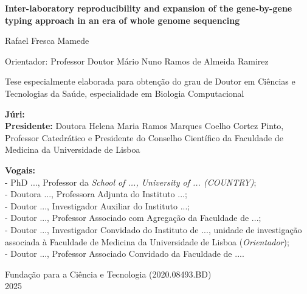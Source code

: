 \begin{titlepage}
\begin{center}
        \vspace{0cm}

        \large
        \textbf{Inter-laboratory reproducibility and expansion of the gene-by-gene typing approach in an era of whole genome sequencing}
        \normalsize
        
        \vspace{0.1cm}
        
        \large
        Rafael Fresca Mamede
        \normalsize
        
        \vspace{0.1cm}
        
        Orientador: Professor Doutor Mário Nuno Ramos de Almeida Ramirez\\
        
        \vspace{0.1cm}
        
        Tese especialmente elaborada para obtenção do grau de Doutor em Ciências e Tecnologias da Saúde, especialidade em Biologia Computacional\\


        \end{center}
        \vspace{0cm}

        \small
        \textbf{Júri:}\\
        \textbf{Presidente:} Doutora Helena Maria Ramos Marques Coelho Cortez Pinto, Professor Catedrático e Presidente do Conselho Científico da Faculdade de Medicina da Universidade de Lisboa

        \textbf{Vogais:} \\
        - PhD ..., Professor da \textit{School of ..., University of ... (COUNTRY)}; \\
        - Doutora ..., Professora Adjunta do Instituto ...; \\
        - Doutor ..., Investigador Auxiliar do Instituto ...; \\
        - Doutor ..., Professor Associado com Agregação da Faculdade de ...; \\
        - Doutor ..., Investigador Convidado do Instituto de ..., unidade de investigação associada à Faculdade de Medicina da Universidade de Lisboa (\textit{Orientador}); \\
        - Doutor ..., Professor Associado Convidado da Faculdade de ....
    \begin{center}
        \normalsize
        Fundação para a Ciência e Tecnologia (2020.08493.BD)\\        
        2025
    \end{center}
\end{titlepage}